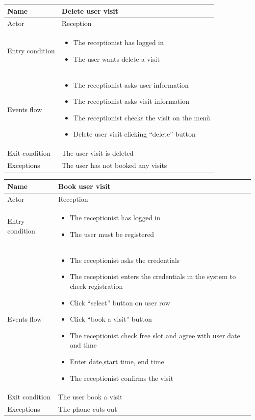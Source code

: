 \begin{tabular}{|p{5cm} | p{7cm} | }
	\hline
	Name & Delete user visit  \\
	\hline
	Actor & Reception \\
	\hline
	Entry condition &
	\begin{itemize}
		\item The receptionist has logged in 
		\item The user wants delete a visit
	\end{itemize} \\
	\hline
	Events flow & 
	\begin{itemize}
		\item The receptionist asks user information
		\item The receptionist asks visit information
		\item The receptionist checks the visit on the menù
		\item Delete user visit clicking “delete” button
	\end{itemize} \\
	\hline
	Exit condition &
	The user visit is deleted\\
	\hline 
	Exceptions & 
	The user has not booked any visits \\
	\hline
\end{tabular}

\begin{tabular}{|p{5cm} | p{7cm} | }
	\hline
	Name & Book user visit  \\
	\hline
	Actor & Reception \\
	\hline
	Entry condition &
	\begin{itemize}
		\item The receptionist has logged in 
		\item The user must be registered
	\end{itemize} \\
	\hline
	Events flow & 
	\begin{itemize}
		\item The receptionist asks the credentials
		\item The receptionist enters the credentials in the system to check registration
		\item Click “select” button on user row
		\item Click “book a visit” button 
		\item The receptionist check free slot and agree with user date and time
		\item Enter date,start time, end time
		\item The receptionist confirms the visit
	\end{itemize} \\
	\hline
	Exit condition &
	The user book a visit\\
	\hline 
	Exceptions & 
	The phone cuts out \\
	\hline
\end{tabular}
 
